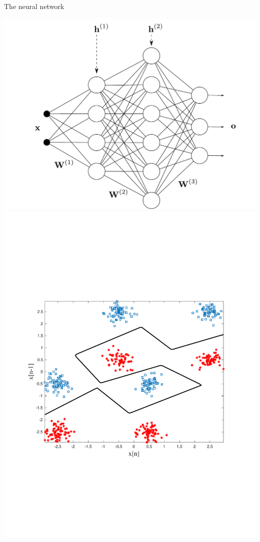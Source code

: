 \documentclass{beamer}
\begin{document}
\begin{frame}{The neural network}

\begin{center}
    \includegraphics[scale=0.3]{pics/mlp.pdf}\\
       \includegraphics[scale=0.18]{pics/NN_relu1.pdf}

\end{center}
\end{frame}
\end{document}
